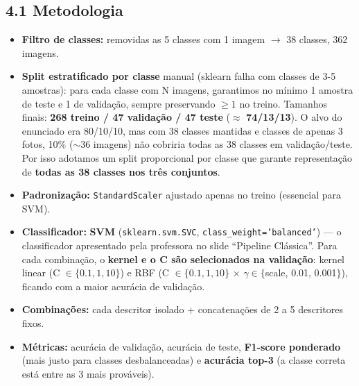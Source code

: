 \documentclass[12pt, a4paper]{article}
\begin{document}
\subsection*{4.1 Metodologia}
\begin{itemize}
    \item \textbf{Filtro de classes:} removidas as 5 classes com 1 imagem $\to$ 38 classes, 362 imagens.
    \item \textbf{Split estratificado por classe} manual (sklearn falha com classes de 3-5 amostras): para cada classe com N imagens, garantimos no mínimo 1 amostra de teste e 1 de validação, sempre preservando $\geq 1$ no treino. Tamanhos finais: \textbf{268 treino / 47 validação / 47 teste} ($\approx$ \textbf{74/13/13}). O alvo do enunciado era 80/10/10, mas com 38 classes mantidas e classes de apenas 3 fotos, 10\% ($\sim$36 imagens) não cobriria todas as 38 classes em validação/teste. Por isso adotamos um split proporcional por classe que garante representação de \textbf{todas as 38 classes nos três conjuntos}.
    \item \textbf{Padronização:} \texttt{StandardScaler} ajustado apenas no treino (essencial para SVM).
    \item \textbf{Classificador:} \textbf{SVM} (\texttt{sklearn.svm.SVC}, \texttt{class\_weight='balanced'}) --- o classificador apresentado pela professora no slide ``Pipeline Clássica''. Para cada combinação, o \textbf{kernel e o C são selecionados na validação}: kernel linear (C $\in \{0.1, 1, 10\}$) e RBF (C $\in \{0.1, 1, 10\}$ $\times$ $\gamma \in \{$scale, 0.01, 0.001$\}$), ficando com a maior acurácia de validação.
    \item \textbf{Combinações:} cada descritor isolado + concatenações de 2 a 5 descritores fixos.
    \item \textbf{Métricas:} acurácia de validação, acurácia de teste, \textbf{F1-score ponderado} (mais justo para classes desbalanceadas) e \textbf{acurácia top-3} (a classe correta está entre as 3 mais prováveis).
\end{itemize}
\end{document}

